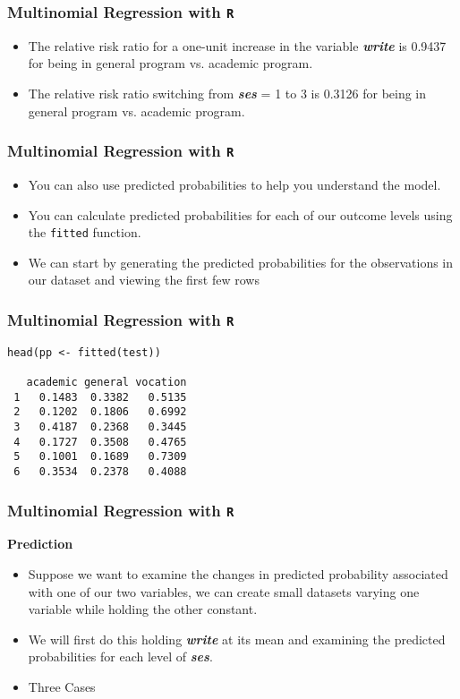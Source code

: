 \documentclass[00-GLMregslides.tex]{subfiles}
\begin{document}
\begin{frame}[fragile]

\frametitle{Multinomial Regression with \texttt{R}}
\Large
\begin{itemize}
\item The relative risk ratio for a one-unit increase in the variable \textbf{\textit{write}} is 0.9437 for being in general program vs. academic program. 
\item The relative risk ratio switching from \textbf{\textit{ses}} = 1 to 3 is 0.3126 for being in general program vs. academic program. 
\end{itemize}
\end{frame}
\begin{frame}[fragile]

\frametitle{Multinomial Regression with \texttt{R}}
\Large
\begin{itemize}
\item You can also use predicted probabilities to help you understand the model. 
\item You can calculate predicted probabilities for each of our outcome levels using the \texttt{fitted} function. 
\item We can start by generating the predicted probabilities for the observations in our dataset and viewing the first few rows
\end{itemize}
\end{frame}
\begin{frame}[fragile]

\frametitle{Multinomial Regression with \texttt{R}}
\Large
\begin{verbatim}
head(pp <- fitted(test))
 
   academic general vocation
 1   0.1483  0.3382   0.5135
 2   0.1202  0.1806   0.6992
 3   0.4187  0.2368   0.3445
 4   0.1727  0.3508   0.4765
 5   0.1001  0.1689   0.7309
 6   0.3534  0.2378   0.4088
\end{verbatim} 
\end{frame}
\begin{frame}[fragile]
	
	\frametitle{Multinomial Regression with \texttt{R}}
	\Large
\textbf{Prediction}
\begin{itemize}
\item Suppose we want to examine the changes in predicted probability associated with one of our two variables, we can create small datasets varying one 
variable while holding the other constant. 
\item We will first do this holding \textbf{\textit{write}} at its mean and examining the predicted probabilities for each level of \textbf{\textit{ses}}.
\item Three Cases
\end{itemize}

 
\end{frame}
\end{document}
